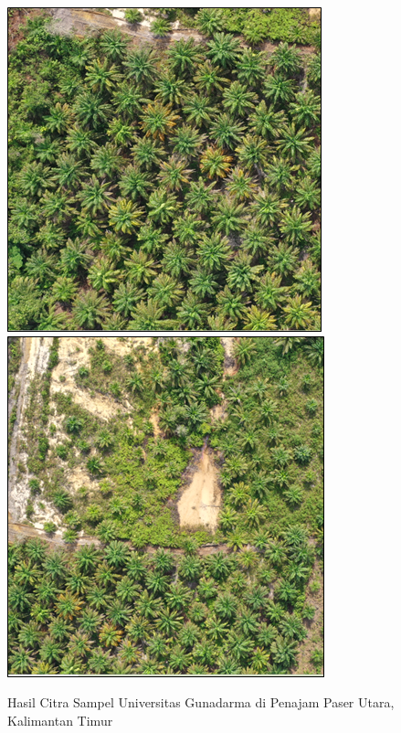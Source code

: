\begin{figure}[H]
	\vspace{-0.1cm}
	\begin{center}
		\includegraphics[width=0.6\columnwidth]{bab4/Gambar/Picture4.1.png}
		\hspace{1cm}
		\includegraphics[width=0.6\columnwidth]{bab4/Gambar/Picture4.2.png}
	\end{center}
	\vspace{-0.2cm}
	\captionsetup{justification=centering}
	\caption{Hasil Citra Sampel Universitas Gunadarma di Penajam Paser Utara, Kalimantan Timur}\label{img:Hasil-Citra-Sampel-Universitas-Gunadarma-1}
\end{figure}

